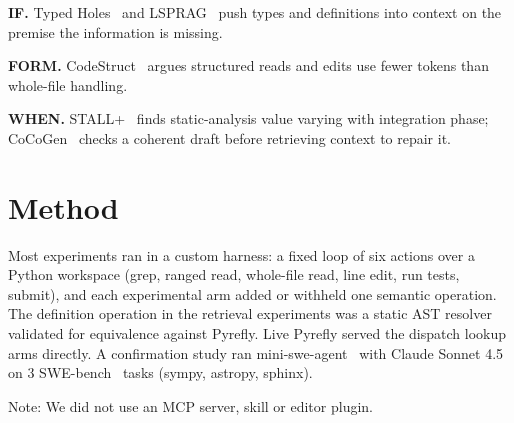 \documentclass[
]{article}
\begin{document}
\textbf{IF.} Typed Holes~\citep{blinn2024typedholes} and
LSPRAG~\citep{go2025lsprag} push types and definitions into context on
the premise the information is missing.

\textbf{FORM.} CodeStruct~\citep{kim2026codestruct} argues structured
reads and edits use fewer tokens than whole-file handling.

\textbf{WHEN.} STALL+~\citep{liu2024stallplus} finds static-analysis
value varying with integration phase; CoCoGen~\citep{bi2024cocogen}
checks a coherent draft before retrieving context to repair it.

\section{Method}\label{method}

Most experiments ran in a custom harness: a fixed loop of six actions
over a Python workspace (grep, ranged read, whole-file read, line edit,
run tests, submit), and each experimental arm added or withheld one
semantic operation. The definition operation in the retrieval
experiments was a static AST resolver validated for equivalence against
Pyrefly. Live Pyrefly served the dispatch lookup arms directly. A
confirmation study ran
mini-swe-agent~\citep{minisweagent,yang2024sweagent} with Claude Sonnet
4.5 on 3 SWE-bench~\citep{jimenez2024swebench} tasks (sympy, astropy,
sphinx).

Note: We did not use an MCP server, skill or editor plugin.
\end{document}
